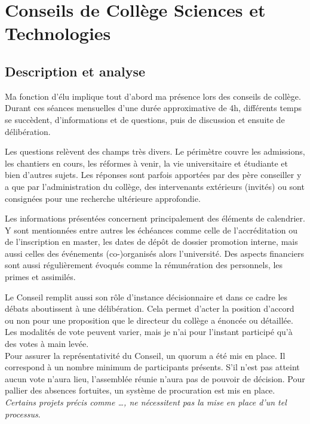 \documentclass{article}
\begin{document}
\section{Conseils de Collège Sciences et Technologies}

\subsection{Description et analyse}
Ma fonction d'élu implique tout d'abord ma présence lors des conseils de collège. 
Durant ces séances mensuelles d'une durée approximative de 4h, différents temps se succèdent, d'informations et de questions, puis de discussion et ensuite de délibération. 

Les questions relèvent des champs très divers. 
Le périmètre couvre les admissions, les chantiers en cours, les réformes à venir, la vie universitaire et étudiante et bien d'autres sujets. 
Les réponses sont parfois apportées par des père conseiller y a que par l'administration du collège, des intervenants extérieurs (invités) ou sont consignées pour une recherche ultérieure approfondie. 

Les informations présentées concernent principalement des éléments de calendrier. Y sont mentionnées entre autres les échéances comme celle de l'accréditation ou de l'inscription en master, les dates de dépôt de dossier promotion interne, mais aussi celles des événements (co-)organisés alors l'université. Des aspects financiers sont aussi régulièrement évoqués comme la rémunération des personnels, les primes et assimilés. 

Le Conseil remplit aussi son rôle d’instance décisionnaire et dans ce cadre les débats aboutissent à une délibération. 
Cela permet d'acter la position d'accord ou non pour une proposition que le directeur du collège a énoncée ou détaillée. 
Les modalités de vote peuvent varier, mais je n'ai pour l'instant participé qu’à des votes à main levée. \\
Pour assurer la représentativité du Conseil, un quorum a été mis en place. Il correspond à un nombre minimum de participants présents. 
S'il n'est pas atteint aucun vote n'aura lieu, l’assemblée réunie n’aura pas de pouvoir de décision. 
Pour pallier des absences fortuites, un système de procuration est mis en place. \textit{Certains projets précis comme …, ne nécessitent pas la mise en place d’un tel processus}.
\end{document}
